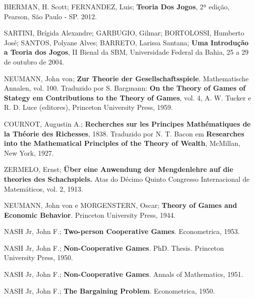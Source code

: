 %

\begin{thebibliography}{20}

BIERMAN, H. Scott; FERNANDEZ, Luis;
\textbf{Teoria Dos Jogos},
2ª edição, 
Pearson, São Paulo - SP.
2012.

SARTINI, Brígida Alexandre; GARBUGIO, Gilmar; BORTOLOSSI, Humberto José; SANTOS, Polyane Alves; BARRETO, Larissa Santana;
\textbf{Uma Introdução a Teoria dos Jogos},
II Bienal da SBM, Universidade Federal da Bahia, 25 a 29 de outubro de 2004.

NEUMANN, John von;
\textbf{Zur Theorie der Gesellschaftsspiele}. Mathematische Annalen, vol. 100. Traduzido por S. Bargmann: \textbf{On the Theory of Games of Stategy em Contributions to the Theory of Games}, vol. 4, A. W. Tucker e R. D. Luce (editores), Princeton University Press, 1959.

COURNOT, Augustin A.; 
\textbf{Recherches sur les Principes Mathématiques de la Théorie des Richesses}, 1838. Traduzido por N. T. Bacon em \textbf{Researches into the Mathematical Principles of the Theory of Wealth}, 
McMillan, New York, 1927.

ZERMELO, Ernst;
\textbf{Über eine Anwendung der Mengdenlehre auf die theories des Schachspiels.} Atas do Décimo Quinto Congresso Internacional de Matemáticos, vol. 2, 1913.

NEUMANN, John von e MORGENSTERN, Oscar; \textbf{Theory of Games and Economic Behavior}. 
Princeton University Press, 1944.

NASH Jr, John F.; \textbf{Two-person Cooperative Games}. 
Econometrica, 1953.

NASH Jr, John F.; \textbf{Non-Cooperative Games}. PhD. Thesis. 
Princeton University Press, 1950.

NASH Jr, John F.; \textbf{Non-Cooperative Games}. 
Annals of Mathematics, 1951.

NASH Jr, John F.; \textbf{The Bargaining Problem}. 
Econometrica, 1950.

\end{thebibliography}

%